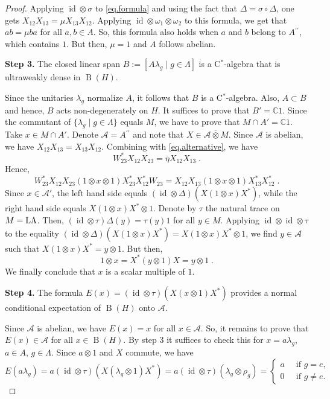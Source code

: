 \documentclass[a4paper,11pt]{amsart}
\numberwithin{equation}{section}
\begin{document}
\begin{proof}
Applying ${\mathord{\operatorname{id}}} {\otimes} \sigma$ to \eqref{eq.formula} and using the fact that ${\Delta} = \sigma \circ {\Delta}$, one gets $X_{12} X_{13} = \mu X_{13} X_{12}$.
Applying ${\mathord{\operatorname{id}}} {\otimes} {\omega}_1 {\otimes} {\omega}_2$ to this formula, we get that $ab = \mu b a$ for all $a,b \in A$. So, this formula also holds when $a$ and $b$ belong to $A{^{\prime\prime}}$, which contains $1$. But then, $\mu = 1$ and $A$ follows abelian.

{\bf Step 3.} The closed linear span $B:=[A \lambda_g \mid g \in \Lambda]$ is a C$^*$-algebra that is ultraweakly dense in ${\operatorname{B}}(H)$.

Since the unitaries $\lambda_g$ normalize $A$, it follows that $B$ is a C$^*$-algebra. Also, $A \subset B$ and hence, $B$ acts non-degenerately on $H$. It suffices to prove that $B' = {\mathbb{C}} 1$. Since the commutant of $\{\lambda_g \mid g \in \Lambda\}$ equals $M$, we have to prove that $M \cap A' = {\mathbb{C}} 1$. Take $x \in M \cap A'$. Denote ${\mathcal{A}} = A{^{\prime\prime}}$ and note that $X \in {\mathcal{A}} {\mathbin{\overline{\otimes}}} M$. Since ${\mathcal{A}}$ is abelian, we have $X_{12} X_{13} = X_{13} X_{12}$. Combining with \eqref{eq.alternative}, we have
$$W^*_{23} X_{12} X_{23} = \overline{\eta} X_{12} X_{13} \; .$$
Hence,
$$W^*_{23} X_{12} X_{23} (1 {\otimes} x {\otimes} 1) X_{23}^* X_{12}^* W_{23} = X_{12} X_{13} (1 {\otimes} x {\otimes} 1) X_{13}^* X_{12}^* \; .$$
Since $x \in {\mathcal{A}}'$, the left hand side equals $({\mathord{\operatorname{id}}} {\otimes} {\Delta})(X (1 {\otimes} x)X^*)$, while the right hand side equals $X(1 {\otimes} x)X^* {\otimes} 1$. Denote by $\tau$ the natural trace on $M = {\mathord{\text{\rm L}}} \Lambda$. Then, $({\mathord{\operatorname{id}}} {\otimes} \tau){\Delta}(y) = \tau(y) 1$ for all $y \in M$. Applying ${\mathord{\operatorname{id}}} {\otimes} {\mathord{\operatorname{id}}} {\otimes} \tau$ to the equality $({\mathord{\operatorname{id}}} {\otimes} {\Delta})(X (1 {\otimes} x)X^*) = X(1 {\otimes} x)X^* {\otimes} 1$, we find $y \in {\mathcal{A}}$ such that $X (1 {\otimes} x) X^* = y {\otimes} 1$. But then,
$$1 {\otimes} x = X^* (y {\otimes} 1) X = y {\otimes} 1 \; .$$
We finally conclude that $x$ is a scalar multiple of $1$.

{\bf Step 4.} The formula $E(x) = ({\mathord{\operatorname{id}}} {\otimes} \tau)(X (x {\otimes} 1) X^*)$ provides a normal conditional expectation of ${\operatorname{B}}(H)$ onto ${\mathcal{A}}$.

Since ${\mathcal{A}}$ is abelian, we have $E(x) = x$ for all $x \in {\mathcal{A}}$. So, it remains to prove that $E(x) \in {\mathcal{A}}$ for all $x \in {\operatorname{B}}(H)$. By step 3 it suffices to check this for $x = a \lambda_g$, $a \in A$, $g \in \Lambda$. Since $a {\otimes} 1$ and $X$ commute, we have
$$E(a \lambda_g) = a ({\mathord{\operatorname{id}}} {\otimes} \tau)(X(\lambda_g {\otimes} 1) X^*) = a ({\mathord{\operatorname{id}}} {\otimes} \tau)(\lambda_g {\otimes} \rho_g) = \begin{cases} a &\;\;\text{if $g = e$,}\\
0 &\;\;\text{if $g \neq e$.}\end{cases}$$


\end{proof}
\end{document}
